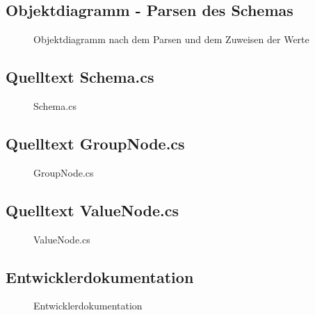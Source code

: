 \subsection{Objektdiagramm - Parsen des Schemas}
\label{app:ObjDiagramsdiagrammSchemaParsen}
\begin{figure}[htb]
\centering
{}
\caption{Objektdiagramm nach dem Parsen und dem Zuweisen der Werte}
\end{figure}
\clearpage




\subsection{Quelltext Schema.cs}
\label{app:SchemaSrc}
\begin{figure}[htb]
\centering
{}
\caption{Schema.cs}
\end{figure}
\clearpage




\subsection{Quelltext GroupNode.cs}
\label{app:GroupNodeSrc}
\begin{figure}[htb]
\centering
{}
\caption{GroupNode.cs}
\end{figure}
\clearpage


\subsection{Quelltext ValueNode.cs}
\label{app:ValueNodeSrc}
\begin{figure}[htb]
\centering
{}
\caption{ValueNode.cs}
\end{figure}
\clearpage


\subsection{Entwicklerdokumentation}
\label{app:Entwicklerdokumentation}
\begin{figure}[htb]
\centering
{}
\caption{Entwicklerdokumentation}
\end{figure}
\clearpage
